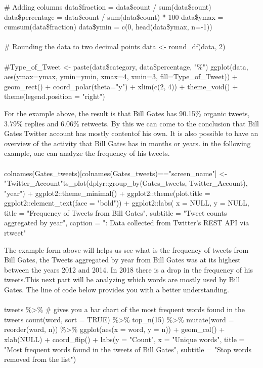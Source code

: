 \begin{flushleft}

	\# Adding columns
	data\$fraction = data\$count / sum(data\$count)
	data\$percentage = data\$count / sum(data\$count) * 100
	data\$ymax = cumsum(data\$fraction)
	data\$ymin = c(0, head(data\$ymax, n=-1))\\
	\\
	\# Rounding the data to two decimal points
	data <- round\_df(data, 2)\\
	\\
	\#Type\_of\_Tweet <- paste(data\$category, data\$percentage, "\%")
	ggplot(data, aes(ymax=ymax, ymin=ymin, xmax=4, xmin=3, fill=Type\_of\_Tweet)) +
	geom\_rect() +
	coord\_polar(theta="y") +
	xlim(c(2, 4)) +
	theme\_void() +
	theme(legend.position = "right")
\end{flushleft}

For the example above, the result is that Bill Gates has 90.15\% organic tweets, 3.79\% replies and 6.06\% retweets. By this we can come to the conclusion that Bill Gates Twitter account has mostly contentof his own.
It is also possible to have an overview of the activity that Bill Gates has in months or years. in the following example, one can analyze the frequency of his tweets.\\
\\
colnames(Gates\_tweets)[colnames(Gates\_tweets)=="screen\_name"] <- "Twitter\_Account"ts\_plot(dplyr::group\_by(Gates\_tweets, Twitter\_Account), "year") +
ggplot2::theme\_minimal() +
ggplot2::theme(plot.title = ggplot2::element\_text(face = "bold")) +
ggplot2::labs(
x = NULL, y = NULL,
title = "Frequency of Tweets from Bill Gates",
subtitle = "Tweet counts aggregated by year",
caption = "\nSource: Data collected from Twitter's REST API via rtweet"

	
The example form above will helps us see what is the frequency of tweets from Bill Gates, the Tweets aggregated by year from Bill Gates was at its highest between the years 2012 and 2014. In 2018 there is a drop in the frequency of his tweets.This next part will be analyzing which words are mostly used by Bill Gates. The line of code below provides you with a better understanding.\\
\\
tweets \%>\% # gives you a bar chart of the most frequent words found in the tweets
count(word, sort = TRUE) \%>\%
top\_n(15) \%>\%
mutate(word = reorder(word, n)) \%>\%
ggplot(aes(x = word, y = n)) +
geom\_col() +
xlab(NULL) +
coord\_flip() +
labs(y = "Count",
x = "Unique words",
title = "Most frequent words found in the tweets of Bill Gates",
subtitle = "Stop words removed from the list")

